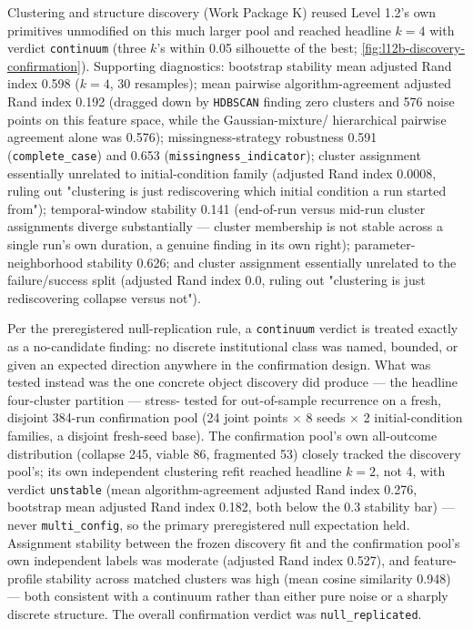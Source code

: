 Clustering and structure discovery (Work Package K) reused Level 1.2's own
primitives unmodified on this much larger pool and reached headline
$k=4$ with verdict \texttt{continuum} (three $k$'s within 0.05 silhouette
of the best; \cref{fig:l12b-discovery-confirmation}). Supporting
diagnostics: bootstrap stability mean adjusted Rand index 0.598 ($k=4$,
30 resamples); mean pairwise algorithm-agreement adjusted Rand index
0.192 (dragged down by \texttt{HDBSCAN} finding zero clusters and 576
noise points on this feature space, while the Gaussian-mixture/
hierarchical pairwise agreement alone was 0.576); missingness-strategy
robustness 0.591 (\texttt{complete\_case}) and 0.653
(\texttt{missingness\_indicator}); cluster assignment essentially
unrelated to initial-condition family (adjusted Rand index 0.0008,
ruling out "clustering is just rediscovering which initial condition a
run started from"); temporal-window stability 0.141 (end-of-run versus
mid-run cluster assignments diverge substantially --- cluster membership
is not stable across a single run's own duration, a genuine finding in
its own right); parameter-neighborhood stability 0.626; and cluster
assignment essentially unrelated to the failure/success split (adjusted
Rand index 0.0, ruling out "clustering is just rediscovering collapse
versus not").

Per the preregistered null-replication rule, a \texttt{continuum} verdict
is treated exactly as a no-candidate finding: no discrete institutional
class was named, bounded, or given an expected direction anywhere in the
confirmation design. What was tested instead was the one concrete object
discovery did produce --- the headline four-cluster partition --- stress-
tested for out-of-sample recurrence on a fresh, disjoint 384-run
confirmation pool (24 joint points $\times$ 8 seeds $\times$ 2
initial-condition families, a disjoint fresh-seed base). The confirmation
pool's own all-outcome distribution (collapse 245, viable 86, fragmented
53) closely tracked the discovery pool's; its own independent clustering
refit reached headline $k=2$, not 4, with verdict \texttt{unstable} (mean
algorithm-agreement adjusted Rand index 0.276, bootstrap mean adjusted
Rand index 0.182, both below the 0.3 stability bar) --- never
\texttt{multi\_config}, so the primary preregistered null expectation
held. Assignment stability between the frozen discovery fit and the
confirmation pool's own independent labels was moderate (adjusted Rand
index 0.527), and feature-profile stability across matched clusters was
high (mean cosine similarity 0.948) --- both consistent with a continuum
rather than either pure noise or a sharply discrete structure. The overall
confirmation verdict was \texttt{null\_replicated}.

